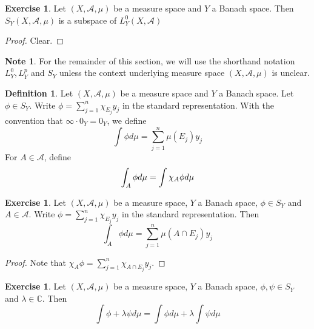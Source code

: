 \documentclass{book}
\theoremstyle{definition}
\newtheorem{defn}[definition]{Definition}
\newtheorem{note}[definition]{Note}
\newtheorem{ex}[definition]{Exercise}
\newcommand{\lam}{\lambda}
\newcommand{\C}{\mathbb{C}}
\newcommand{\MA}{\mathcal{A}}
\newcommand{\lex}[1]{\label{ex:#1}}
\newcommand{\ld}[1]{\label{defn:#1}}
\DeclareMathOperator*{\0}{\mbf{0}}
\DeclareMathOperator*{\1}{\mbf{1}}
\begin{document}
	\begin{ex} \lex{00000} 
	Let $(X, \MA, \mu)$ be a measure space and $Y$ a Banach space. Then $S_Y(X, \MA, \mu)$ is a subspace of $L_Y^0(X, \MA)$
	\end{ex}
	
	\begin{proof}
	Clear.
	\end{proof}
	
	\begin{note}
	For the remainder of this section, we will use the shorthand notation $L^0_Y, L^p_Y$ and $S_Y$ unless the context underlying measure space $(X, \MA, \mu)$ is unclear.
	\end{note}
	
	\begin{defn} \ld{00000} 
	Let $(X, \MA, \mu)$ be a measure space and $Y$ a Banach space. Let $\phi \in S_Y$. Write $\phi = \sum\limits_{j=1}^n\chi_{E_j}y_j$ in the standard representation. With the convention that $\infty \cdot 0_Y = 0_Y$, we define $$\int \phi d\mu = \sum\limits_{j=1}^n \mu(E_j)y_j $$ For $A \in \MA$, define  $$\int_A \phi d \mu = \int \chi_A \phi d\mu \\$$
	\end{defn}
	
	\begin{ex} \lex{00000} 
	Let $(X, \MA, \mu)$ be a measure space, $Y$ a Banach space, $\phi \in S_Y$ and $A \in \MA$. Write $\phi = \sum\limits_{j=1}^n\chi_{E_j}y_j$ in the standard representation. Then $$\int_A \phi d\mu = \sum_{j=1}^n \mu(A \cap E_j)y_j$$
	\end{ex}
	
	\begin{proof}
	Note that $\chi_A \phi = \sum\limits_{j=1}^n\chi_{A \cap E_j}y_j$.
	\end{proof}		
	
	\begin{ex} \lex{00000} 
	Let $(X, \MA, \mu)$ be a measure space, $Y$ a Banach space, $\phi, \psi \in S_Y$ and $\lam \in \C$. Then $$\int \phi + \lam \psi d\mu = \int \phi d \mu + \lam \int \psi d\mu $$
	\end{ex}
	
\end{document}
